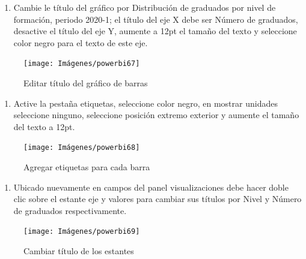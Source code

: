 \documentclass[
]{book}
\providecommand{\tightlist}{%
  \setlength{\itemsep}{0pt}\setlength{\parskip}{0pt}}
\begin{document}
\begin{enumerate}
\def\labelenumi{\arabic{enumi}.}
\setcounter{enumi}{3}
\tightlist
\item
  Cambie le título del gráfico por Distribución de graduados por nivel de formación, periodo 2020-1; el título del eje X debe ser Número de graduados, desactive el título del eje Y, aumente a 12pt el tamaño del texto y seleccione color negro para el texto de este eje.
\end{enumerate}

\begin{figure}

{\centering \texttt{[image: Imágenes/powerbi67]} 

}

\caption{Editar título del gráfico de barras}\label{fig:paso4barras-fig}
\end{figure}

\begin{enumerate}
\def\labelenumi{\arabic{enumi}.}
\setcounter{enumi}{4}
\tightlist
\item
  Active la pestaña etiquetas, seleccione color negro, en mostrar unidades seleccione ninguno, seleccione posición extremo exterior y aumente el tamaño del texto a 12pt.
\end{enumerate}

\begin{figure}

{\centering \texttt{[image: Imágenes/powerbi68]} 

}

\caption{Agregar etiquetas para cada barra}\label{fig:paso5barras-fig}
\end{figure}

\begin{enumerate}
\def\labelenumi{\arabic{enumi}.}
\setcounter{enumi}{5}
\tightlist
\item
  Ubicado nuevamente en campos del panel visualizaciones debe hacer doble clic sobre el estante eje y valores para cambiar sus títulos por Nivel y Número de graduados respectivamente.
\end{enumerate}

\begin{figure}

{\centering \texttt{[image: Imágenes/powerbi69]} 

}

\caption{Cambiar título de los estantes}\label{fig:paso6barras-fig}
\end{figure}
\end{document}
